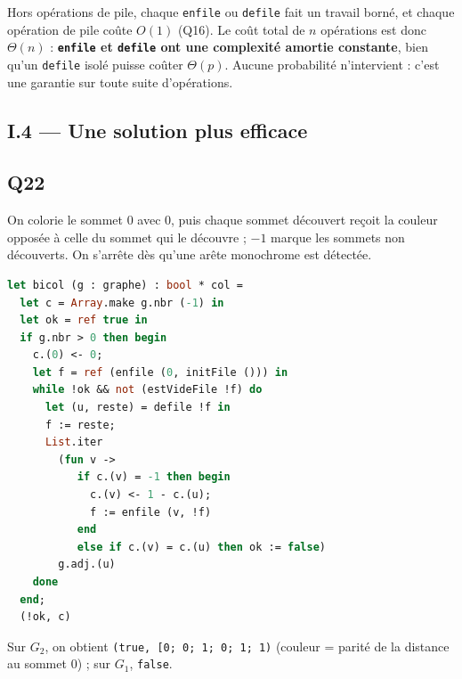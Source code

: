\documentclass[11pt,a4paper]{article}
\newcommand{\equationajustee}[1]{%
  \sbox{\boiteequation}{$\displaystyle #1$}%
  \ifdim\wd\boiteequation>\linewidth
    \[\resizebox{\linewidth}{!}{\usebox{\boiteequation}}\]%
  \else
    \[#1\]%
  \fi}
\begin{document}
\equationajustee{\begin{aligned}
N &\ge k + d \\
&= n, \\
N &\le k + 2k + d \\
&= n + 2k \\
&\le 3n.
\end{aligned}}

\equationajustee{\boxed{\,n \le N \le 3n\,}}

Hors opérations de pile, chaque \texttt{enfile} ou \texttt{defile} fait un travail borné, et chaque opération de pile coûte \(O(1)\) (Q16). Le coût total de \(n\) opérations est donc \(\Theta(n)\) : \textbf{\texttt{enfile} et \texttt{defile} ont une complexité amortie constante}, bien qu'un \texttt{defile} isolé puisse coûter \(\Theta(p)\). Aucune probabilité n'intervient : c'est une garantie sur toute suite d'opérations.

\hypertarget{i.4-une-solution-plus-efficace}{%
\subsection{I.4 --- Une solution plus efficace}\label{i.4-une-solution-plus-efficace}}

\hypertarget{q22}{%
\subsection{Q22}\label{q22}}

On colorie le sommet \(0\) avec \(0\), puis chaque sommet découvert reçoit la couleur opposée à celle du sommet qui le découvre ; \(-1\) marque les sommets non découverts. On s'arrête dès qu'une arête monochrome est détectée.

\begin{lstlisting}[language=Caml]
let bicol (g : graphe) : bool * col =
  let c = Array.make g.nbr (-1) in
  let ok = ref true in
  if g.nbr > 0 then begin
    c.(0) <- 0;
    let f = ref (enfile (0, initFile ())) in
    while !ok && not (estVideFile !f) do
      let (u, reste) = defile !f in
      f := reste;
      List.iter
        (fun v ->
           if c.(v) = -1 then begin
             c.(v) <- 1 - c.(u);
             f := enfile (v, !f)
           end
           else if c.(v) = c.(u) then ok := false)
        g.adj.(u)
    done
  end;
  (!ok, c)
\end{lstlisting}

Sur \(G_2\), on obtient \texttt{(\allowbreak{}true,\allowbreak{}\ {[}\textbar{}0;\allowbreak{}\ 0;\allowbreak{}\ 1;\allowbreak{}\ 0;\allowbreak{}\ 1;\allowbreak{}\ 1\textbar{}{]}\allowbreak{})\allowbreak{}} (couleur = parité de la distance au sommet \(0\)) ; sur \(G_1\), \texttt{false}.
\end{document}
